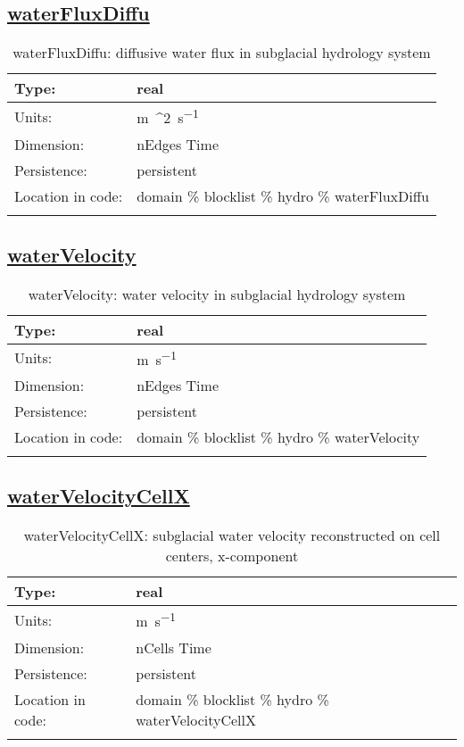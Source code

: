 \subsection[waterFluxDiffu]{\hyperref[sec:var_tab_hydro]{waterFluxDiffu}}
\label{subsec:var_sec_hydro_waterFluxDiffu}
\begin{center}
\begin{longtable}{| p{2.0in} | p{4.0in} |}
        \hline 
        Type: & real \\
        \hline 
        Units: & \si{m{^2}.s^{-1}} \\
        \hline 
        Dimension: & nEdges Time \\
        \hline 
        Persistence: & persistent \\
        \hline 
         Location in code: & domain \% blocklist \% hydro \% waterFluxDiffu \\
         \hline 
    \caption{waterFluxDiffu: diffusive water flux in subglacial hydrology system}
\end{longtable}
\end{center}
\subsection[waterVelocity]{\hyperref[sec:var_tab_hydro]{waterVelocity}}
\label{subsec:var_sec_hydro_waterVelocity}
\begin{center}
\begin{longtable}{| p{2.0in} | p{4.0in} |}
        \hline 
        Type: & real \\
        \hline 
        Units: & \si{m.s^{-1}} \\
        \hline 
        Dimension: & nEdges Time \\
        \hline 
        Persistence: & persistent \\
        \hline 
         Location in code: & domain \% blocklist \% hydro \% waterVelocity \\
         \hline 
    \caption{waterVelocity: water velocity in subglacial hydrology system}
\end{longtable}
\end{center}
\subsection[waterVelocityCellX]{\hyperref[sec:var_tab_hydro]{waterVelocityCellX}}
\label{subsec:var_sec_hydro_waterVelocityCellX}
\begin{center}
\begin{longtable}{| p{2.0in} | p{4.0in} |}
        \hline 
        Type: & real \\
        \hline 
        Units: & \si{m.s^{-1}} \\
        \hline 
        Dimension: & nCells Time \\
        \hline 
        Persistence: & persistent \\
        \hline 
         Location in code: & domain \% blocklist \% hydro \% waterVelocityCellX \\
         \hline 
    \caption{waterVelocityCellX: subglacial water velocity reconstructed on cell centers, x-component}
\end{longtable}
\end{center}
